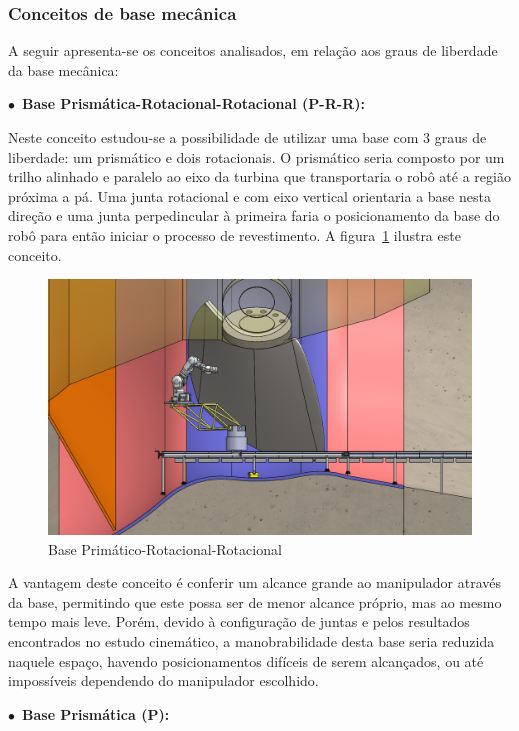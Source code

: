 \subsubsection{Conceitos de base mecânica}\label{sec::conceitos_base}
A seguir apresenta-se os conceitos analisados, em relação aos graus de
liberdade da base mecânica:

$\bullet$~\textbf{Base Prismática-Rotacional-Rotacional (P-R-R):}
  
  Neste conceito estudou-se a possibilidade de utilizar uma base com $3$ graus
  de liberdade: um prismático e dois rotacionais. O prismático seria composto
  por um trilho alinhado e paralelo ao eixo da turbina que transportaria o robô
  até a região próxima a pá. Uma junta rotacional e com eixo vertical orientaria
  a base nesta direção e uma junta perpedincular à primeira faria o
  posicionamento da base do robô para então iniciar o processo de revestimento.
  A figura~\ref{fig::base_prr} ilustra este conceito.
    
  \begin{figure}[h!]
   \centering
   \includegraphics[width=0.8\columnwidth]{detail/figs/bases/base_prr}
   \caption{Base Primático-Rotacional-Rotacional}
   \label{fig::base_prr}
\end{figure}

  A vantagem deste conceito é conferir um alcance grande ao manipulador através
  da base, permitindo que este possa ser de menor alcance próprio, mas ao mesmo
  tempo mais leve.
  Porém, devido à configuração de juntas e pelos resultados encontrados no
  estudo cinemático, a manobrabilidade desta base seria reduzida naquele espaço,
  havendo posicionamentos difíceis de serem alcançados, ou até impossíveis
  dependendo do manipulador escolhido.
  
$\bullet$~\textbf{Base Prismática (P):}

